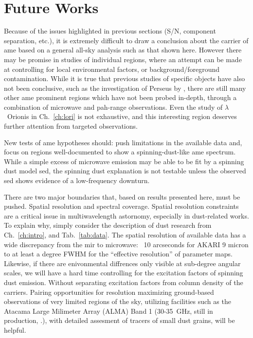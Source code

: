               \section{Future Works}
                  Because of the issues highlighted in previous sections (S/N, component separation, etc.), it is extremely difficult to draw a conclusion about the carrier of \gls{ame} based on a general all-sky analysis such as that shown here. However there may be promise in studies of individual regions, where an attempt can be made at controlling for local environmental factors, or background/foreground contamination. While it is true that previous studies of specific objects have also not been conclusive, such as the investigation of Perseus by \cite{tibbs11}, there are still many other \gls{ame} prominent regions which have not been probed in-depth, through a combination of microwave and \gls{pah}-range observations. Even the study of $\lambda$~Orionis in Ch.~\ref{ch:lori} is not exhaustive, and this interesting region deserves further attention from targeted observations.

                New tests of \gls{ame} hypotheses should: push limitations in the available data and, focus on regions well-documented to show a spinning-dust-like \gls{ame} spectrum. While a simple excess of microwave emission may be able to be fit by a spinning dust model \gls{sed}, the spinning dust explanation is not testable unless the observed \gls{sed} shows evidence of a low-frequency downturn.

                There are two major boundaries that, based on results presented here, must be pushed. Spatial resolution and spectral coverage.
                Spatial resolution constraints are a critical issue in multiwavelength astornomy, especially in dust-related works. To explain why, simply consider the description of dust research from Ch.~\ref{ch:intro}, and Tab.~\ref{tab:data}. The spatial resolution of available data has a wide discrepancy from the \gls{mir} to microwave: ~10 arcseconds for AKARI 9 micron to at least a degree FWHM for the ``effective resolution'' of parameter maps. Likewise, if there are enivonmental diffrences only visible at sub-degree angular scales, we will have a hard time controlling for the excitation factors of spinning dust emission. Without separating excitation factors from column density of the carriers. Pairing opportunities for resolution maximizing ground-based observations of very limited regions of the sky, utilizing facilities such as the Atacama Large Milimeter Array (ALMA) Band 1 (30-35~GHz, still in production, \cite{huang16}.), with detailed assesment of tracers of small dust grains, will be helpful.

